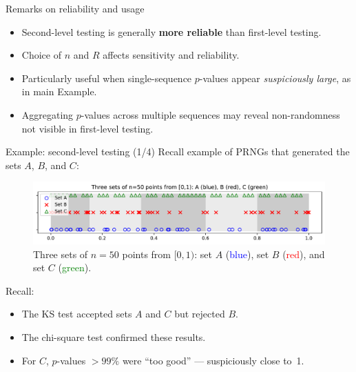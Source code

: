 \documentclass[aspectratio=169]{beamer}
\begin{document}
\begin{frame}{Remarks on reliability and usage}
\begin{itemize}
 \item Second-level testing is generally \textbf{more reliable} than first-level testing.
 \item Choice of $n$ and $R$ affects sensitivity and reliability.
 \item Particularly useful when single-sequence $p$-values appear \textsl{suspiciously large},
       as in main Example.
 \item Aggregating $p$-values across multiple sequences
      may reveal non-randomness not visible in first-level testing.
\end{itemize}
\end{frame}

\begin{frame}{Example: second-level testing (1/4)}
Recall example of PRNGs that generated the sets $A$, $B$, and $C$:
\begin{figure}[h]
\begin{center}
 \includegraphics[width=335pt]{figures_pdf/ch2_prng_sets_A_B_C_points_plot.pdf}
\end{center}
\caption{Three sets of $n=50$ points from $[0,1)$: set $A$ (\textcolor{blue}{blue}), set $B$ (\textcolor{red}{red}), and set $C$ (\textcolor{green}{green}).  }
\label{fig:chi2_ks_points}
\end{figure}


\medskip
\noindent
Recall:
\begin{itemize}
 \item The KS test accepted sets $A$ and $C$ but rejected $B$.
 \item The chi-square test confirmed these results.
 \item For $C$, $p$-values $>99\%$ were ``too good'' --- suspiciously close to~1.
\end{itemize}

\end{frame}
\end{document}
